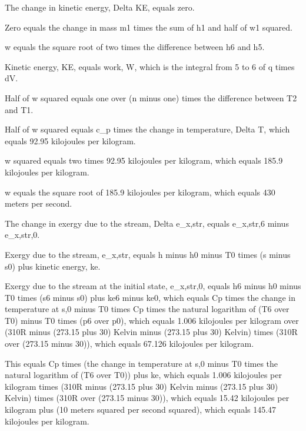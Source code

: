 The change in kinetic energy, Delta KE, equals zero.

Zero equals the change in mass m1 times the sum of h1 and half of w1 squared.

w equals the square root of two times the difference between h6 and h5.

Kinetic energy, KE, equals work, W, which is the integral from 5 to 6 of q times dV.

Half of w squared equals one over (n minus one) times the difference between T2 and T1.

Half of w squared equals c_p times the change in temperature, Delta T, which equals 92.95 kilojoules per kilogram.

w squared equals two times 92.95 kilojoules per kilogram, which equals 185.9 kilojoules per kilogram.

w equals the square root of 185.9 kilojoules per kilogram, which equals 430 meters per second.

The change in exergy due to the stream, Delta e_x,str, equals e_x,str,6 minus e_x,str,0.

Exergy due to the stream, e_x,str, equals h minus h0 minus T0 times (s minus s0) plus kinetic energy, ke.

Exergy due to the stream at the initial state, e_x,str,0, equals h6 minus h0 minus T0 times (s6 minus s0) plus ke6 minus ke0, which equals Cp times the change in temperature at s,0 minus T0 times Cp times the natural logarithm of (T6 over T0) minus T0 times (p6 over p0), which equals 1.006 kilojoules per kilogram over (310R minus (273.15 plus 30) Kelvin minus (273.15 plus 30) Kelvin) times (310R over (273.15 minus 30)), which equals 67.126 kilojoules per kilogram.

This equals Cp times (the change in temperature at s,0 minus T0 times the natural logarithm of (T6 over T0)) plus ke, which equals 1.006 kilojoules per kilogram times (310R minus (273.15 plus 30) Kelvin minus (273.15 plus 30) Kelvin) times (310R over (273.15 minus 30)), which equals 15.42 kilojoules per kilogram plus (10 meters squared per second squared), which equals 145.47 kilojoules per kilogram.